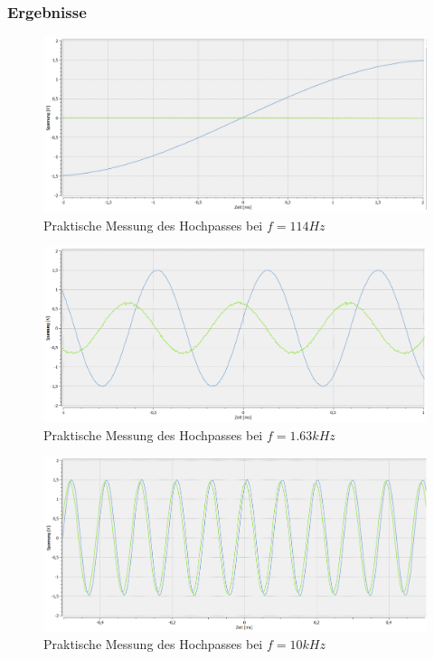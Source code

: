 \subsubsection{Ergebnisse}

\begin{figure}[htb]
    \includegraphics[width=16cm]{./pictures/Messungen/Hochpass_114}
    \caption{Praktische Messung des Hochpasses bei $f=114Hz$}
    \label{fig:Hochpass_114}
\end{figure}

\newpage
\begin{figure}[htb]
    \includegraphics[width=13cm]{./pictures/Messungen/Hochpass_1,63k}
    \caption{Praktische Messung des Hochpasses bei $f=1.63kHz$}
    \label{fig:Hochpass_1,63k}
\end{figure}

\begin{figure}[htb]
    \includegraphics[width=13cm]{./pictures/Messungen/Hochpass_10k}
    \caption{Praktische Messung des Hochpasses bei $f=10kHz$}
    \label{fig:Hochpass_10k}
\end{figure}


